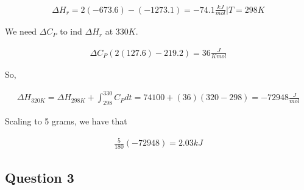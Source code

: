 \documentclass[12pt]{book}
\begin{document}
\begin{align*}
    \Delta H_r=2(-673.6)-(-1273.1)=-74.1\frac{kJ}{mol}|T=298K
\end{align*}

We need $\Delta C_P$ to ind $\Delta H_r$ at $330K$.

\begin{align*}
    \Delta C_P(2(127.6)-219.2)=36\frac{J}{Kmol}
\end{align*}

So,

\begin{align*}
    \Delta H_{320K}=\Delta H_{298K}+\int_{298}^{330}C_P dt=74100+(36)(320-298)=-72948\frac{J}{mol}
\end{align*}

Scaling to 5 grams, we have that

\begin{align*}
    \frac{5}{180}(-72948)=2.03kJ
\end{align*}

\subsection*{Question 3}
\end{document}
